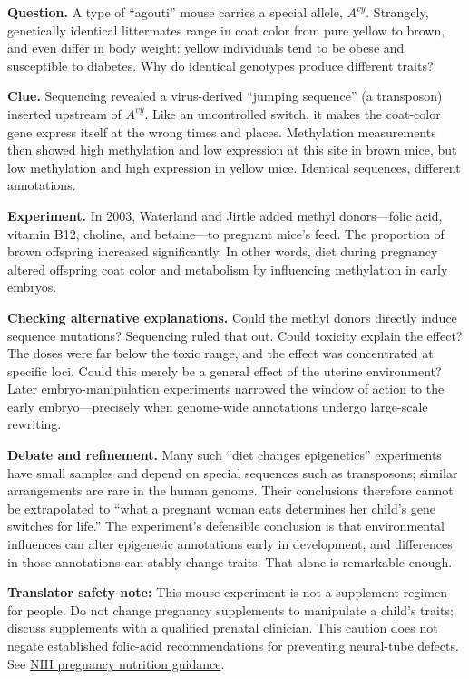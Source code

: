 \begin{zhengju}
\textbf{Question.} A type of ``agouti'' mouse carries a special allele, $A^{vy}$. Strangely, genetically identical littermates range in coat color from pure yellow to brown, and even differ in body weight: yellow individuals tend to be obese and susceptible to diabetes. Why do identical genotypes produce different traits?

\textbf{Clue.} Sequencing revealed a virus-derived ``jumping sequence'' (a transposon) inserted upstream of $A^{vy}$. Like an uncontrolled switch, it makes the coat-color gene express itself at the wrong times and places. Methylation measurements then showed high methylation and low expression at this site in brown mice, but low methylation and high expression in yellow mice. Identical sequences, different annotations.

\textbf{Experiment.} In 2003, Waterland and Jirtle added methyl donors---folic acid, vitamin B12, choline, and betaine---to pregnant mice's feed. The proportion of brown offspring increased significantly. In other words, diet during pregnancy altered offspring coat color and metabolism by influencing methylation in early embryos.

\textbf{Checking alternative explanations.} Could the methyl donors directly induce sequence mutations? Sequencing ruled that out. Could toxicity explain the effect? The doses were far below the toxic range, and the effect was concentrated at specific loci. Could this merely be a general effect of the uterine environment? Later embryo-manipulation experiments narrowed the window of action to the early embryo---precisely when genome-wide annotations undergo large-scale rewriting.

\textbf{Debate and refinement.} Many such ``diet changes epigenetics'' experiments have small samples and depend on special sequences such as transposons; similar arrangements are rare in the human genome. Their conclusions therefore cannot be extrapolated to ``what a pregnant woman eats determines her child's gene switches for life.'' The experiment's defensible conclusion is that environmental influences can alter epigenetic annotations early in development, and differences in those annotations can stably change traits. That alone is remarkable enough.
\end{zhengju}

\textbf{Translator safety note:} This mouse experiment is not a supplement regimen for people. Do not change pregnancy supplements to manipulate a child's traits; discuss supplements with a qualified prenatal clinician. This caution does not negate established folic-acid recommendations for preventing neural-tube defects. See \href{https://ods.od.nih.gov/factsheets/Pregnancy-HealthProfessional/}{NIH pregnancy nutrition guidance}.

